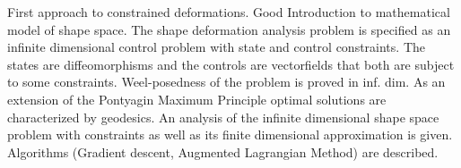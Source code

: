 {
	First approach to constrained deformations. Good Introduction to mathematical model of shape space.
	The shape deformation analysis problem is specified as an infinite dimensional control problem with state and control constraints. The states are diffeomorphisms and the controls are vectorfields that both are subject to some constraints. Weel-posedness of the problem is proved in inf. dim.
	As an extension of the Pontyagin Maximum Principle optimal solutions are characterized by geodesics.
	An analysis of the infinite dimensional shape space problem with constraints as well as its finite dimensional approximation is given. Algorithms (Gradient descent, Augmented Lagrangian Method) are described. 
}